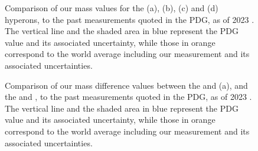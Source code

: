 \begin{figure}[h]
\hspace*{-2cm}
\hspace*{-2cm}
\caption{Comparison of our mass values for the \rmXiM (a), \rmAxiP (b), \rmOmegaM (c) and \rmAomegaP (d) hyperons, to the past measurements quoted in the PDG, as of 2023 \cite{particledatagroupReviewParticlePhysics2022}. The vertical line and the shaded area in blue represent the PDG value and its associated uncertainty, while those in orange correspond to the world average including our measurement and its associated uncertainties.}
	\label{fig:MassWorldAvgVsPDG}
\end{figure}

\begin{figure}[h]
\hspace*{-2cm}
\caption{Comparison of our mass difference values between the \rmXiM and \rmAxiP (a), and the \rmOmegaM and \rmAomegaP, to the past measurements quoted in the PDG, as of 2023 \cite{particledatagroupReviewParticlePhysics2022}. The vertical line and the shaded area in blue represent the PDG value and its associated uncertainty, while those in orange correspond to the world average including our measurement and its associated uncertainties.}
	\label{fig:MassDiffWorldAvgVsPDG}
\end{figure}

